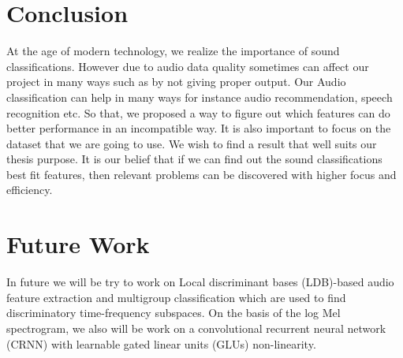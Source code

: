 \section{Conclusion} 
At the age of modern technology, we realize the importance of sound classifications. However due to audio data quality sometimes can affect our project in many ways such as by not giving proper output. Our Audio classification can help in many ways for instance audio recommendation, speech recognition etc. So that, we proposed a way to figure out which features can do better performance in an incompatible way. It is also important to focus on the dataset that we are going to use. We wish to find a result that well suits our thesis purpose. It is our belief that if we can find out the sound classifications best fit features, then relevant problems can be discovered with higher focus and efficiency.
\section{Future Work}
In future we will be try to work on Local discriminant bases (LDB)-based audio feature extraction and multigroup classification which are used to find discriminatory time-frequency subspaces. On the basis of the log Mel spectrogram, we also will be work on a convolutional recurrent neural network (CRNN) with learnable gated linear units (GLUs) non-linearity.